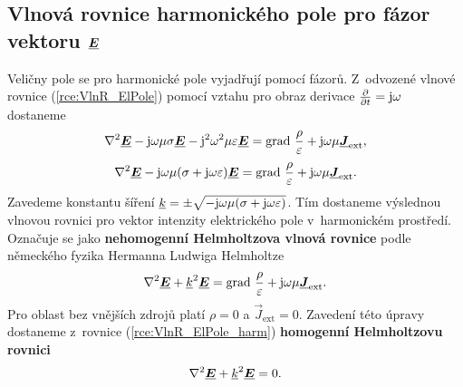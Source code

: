 \subsection*{Vlnová rovnice harmonického pole pro fázor vektoru $\mbox{\underline{\boldmath$E$}}$}
Veličny pole se pro harmonické pole vyjadřují pomocí fázorů. Z~odvozené vlnové rovnice (\ref{rce:VlnR_ElPole}) pomocí vztahu pro obraz derivace $\frac{\partial}{\partial t}=\mathrm{j}\omega$ dostaneme
\begin{displaymath}
	\nabla^{2}\mbox{\underline{\boldmath$E$}} -\mathrm{j}\omega\mu\sigma\mbox{\underline{\boldmath$E$}}-\mathrm{j}^{2}\omega ^{2}\mu\varepsilon\mbox{\underline{\boldmath$E$}} = \mathrm{grad}\ \frac{\rho}{\varepsilon}+\mathrm{j}\omega\mu\mbox{\underline{\boldmath$J$}}_{\mathrm{ext}},
\end{displaymath}
\begin{displaymath}
	\nabla^{2}\mbox{\underline{\boldmath$E$}} -\mathrm{j}\omega\mu(\sigma+\mathrm{j}\omega\varepsilon)\mbox{\underline{\boldmath$E$}} = \mathrm{grad}\ \frac{\rho}{\varepsilon}+ \mathrm{j}\omega\mu\mbox{\underline{\boldmath$J$}}_{\mathrm{ext}}.
\end{displaymath}
Zavedeme konstantu šíření ${\underline{k}}=\pm\sqrt{-\mathrm{j}\omega\mu(\sigma+\mathrm{j}\omega\varepsilon)}$. Tím dostaneme výslednou vlnovou rovnici pro vektor intenzity elektrického pole v~harmonickém prostředí. Označuje se jako {\bf nehomogenní Helmholtzova vlnová rovnice} podle německého fyzika Hermanna Ludwiga Helmholtze
\begin{equation}
	\nabla^{2}\mbox{\underline{\boldmath$E$}} +{\underline{k}}^{2}\mbox{\underline{\boldmath$E$}} = \mathrm{grad}\ \frac{\rho}{\varepsilon}+ \mathrm{j}\omega\mu\mbox{\underline{\boldmath$J$}}_{\mathrm{ext}}.
	\label{rce:VlnR_ElPole_harm} 
\end{equation}
Pro oblast bez vnějších zdrojů platí $\rho = 0$ a $\vec J_{\mathrm{ext}} = 0$. Zavedení této úpravy dostaneme z~rovnice (\ref{rce:VlnR_ElPole_harm}) {\bf homogenní Helmholtzovu rovnici}
\begin{equation}
	\nabla^{2}\mbox{\underline{\boldmath$E$}} +{\underline{k}}^{2}\mbox{\underline{\boldmath$E$}} = 0.
	\label{rce:VlnR_ElPole_harm_BezZdroju} 
\end{equation}

